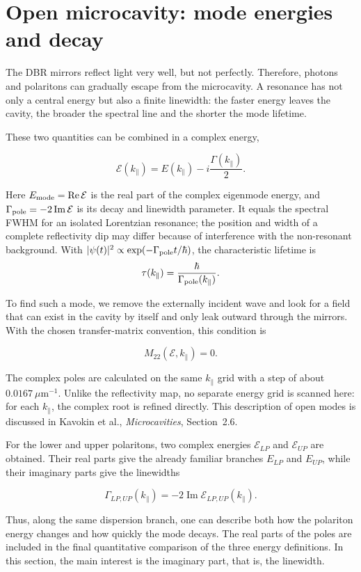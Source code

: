 \documentclass[12pt,a4paper]{article}
\begin{document}
\clearpage
\section{Open microcavity: mode energies and decay}

The DBR mirrors reflect light very well, but not perfectly. Therefore, photons and polaritons can gradually escape from the microcavity. A resonance has not only a central energy but also a finite linewidth: the faster energy leaves the cavity, the broader the spectral line and the shorter the mode lifetime.

These two quantities can be combined in a complex energy,

\[
\mathcal E(k_\parallel)
=
E(k_\parallel)-i\frac{\Gamma(k_\parallel)}{2}.
\]

Here $E_{\rm mode}=\operatorname{Re}\mathcal E$ is the real part of
the complex eigenmode energy, and
$\Gamma_{\rm pole}=-2\operatorname{Im}\mathcal E$ is its decay and linewidth
parameter. It equals the spectral FWHM for an isolated Lorentzian
resonance; the position and width of a complete reflectivity dip may
differ because of interference with the non-resonant background. With
$|\psi(t)|^2\propto\exp(-\Gamma_{\rm pole}t/\hbar)$, the characteristic
lifetime is
\[
\tau(k_\parallel)=\frac{\hbar}{\Gamma_{\rm pole}(k_\parallel)}.
\]

To find such a mode, we remove the externally incident wave and look for a field that can exist in the cavity by itself and only leak outward through the mirrors. With the chosen transfer-matrix convention, this condition is

\[
M_{22}(\mathcal E,k_\parallel)=0.
\]

The complex poles are calculated on the same $k_\parallel$ grid with a step of about $0.0167\ \mu\mathrm m^{-1}$. Unlike the reflectivity map, no separate energy grid is scanned here: for each $k_\parallel$, the complex root is refined directly. This description of open modes is discussed in Kavokin et al., \textit{Microcavities}, Section~2.6.

For the lower and upper polaritons, two complex energies $\mathcal E_{LP}$ and $\mathcal E_{UP}$ are obtained. Their real parts give the already familiar branches $E_{LP}$ and $E_{UP}$, while their imaginary parts give the linewidths

\[
\Gamma_{LP,UP}(k_\parallel)
=-2\operatorname{Im}\mathcal E_{LP,UP}(k_\parallel).
\]

Thus, along the same dispersion branch, one can describe both how the polariton energy changes and how quickly the mode decays. The real parts of the poles are included in the final quantitative comparison of the three energy definitions. In this section, the main interest is the imaginary part, that is, the linewidth.
\end{document}
